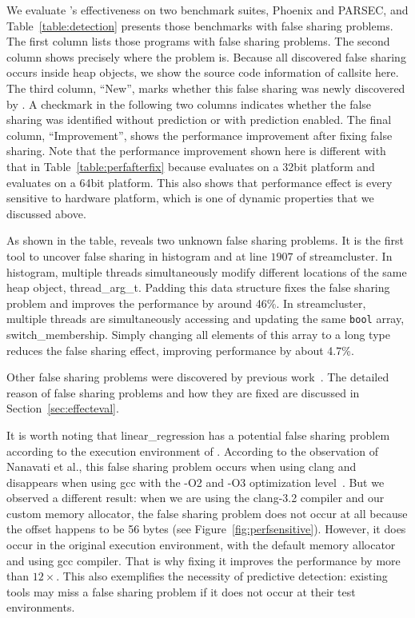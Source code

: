 We evaluate \Predator{}'s effectiveness on two benchmark suites, Phoenix and PARSEC, and Table~\ref{table:detection} presents those benchmarks with false sharing problems. 
The first column lists those programs with false sharing problems.  The second column shows precisely where the problem is. Because all discovered false sharing occurs inside heap objects, we show the source code information of callsite here.  The third column, ``New'', marks whether this false sharing was newly discovered by \Predator{}.  A checkmark in the  following two columns indicates whether the false sharing was identified without prediction or with prediction enabled.  The final column, ``Improvement'', shows the performance improvement after fixing false sharing. Note that the performance improvement shown here is different with that in Table~\ref{table:perfafterfix} because \SheriffDetect{} evaluates on a 32bit platform and \Predator{} evaluates on a 64bit platform. This also shows that performance effect is every sensitive to hardware platform, which is one of dynamic properties that we discussed above. 

As shown in the table, \Predator{} reveals two unknown false sharing problems. It is the first tool to uncover false sharing in histogram and at line $1907$ of streamcluster. 
In histogram, multiple threads simultaneously modify different locations of the same heap object, thread\_arg\_t. 
Padding this data structure fixes the false sharing problem and improves the performance by around 46\%. In streamcluster, multiple threads are simultaneously accessing and updating the same \texttt{bool} array, switch\_membership. Simply changing all elements of this array to a long type reduces the false sharing effect, improving performance by about 4.7\%.

Other false sharing problems were discovered by previous work~\cite{sheriff}. The detailed reason of false sharing problems and how they are fixed are discussed in Section~\ref{sec:effecteval}.

It is worth noting that linear\_regression has a potential false sharing problem according to the execution environment of \Predator{}. According to the observation of Nanavati et al., this false sharing problem occurs when using clang and disappears when using gcc with the -O2 and -O3 optimization level~\cite{OSdetection}. But we observed a different result: when we are using the clang-3.2 compiler and our custom memory allocator, the false sharing problem does not occur at all because the offset happens to be 56 bytes (see Figure~\ref{fig:perfsensitive}). 
However, it does occur in the original execution environment, with the default memory allocator and using gcc compiler. That is why fixing it improves the performance by more than $12\times$.  This also exemplifies the necessity of \Predator{} predictive detection: existing tools may miss a false sharing problem if it does not occur at their test environments. 
 

